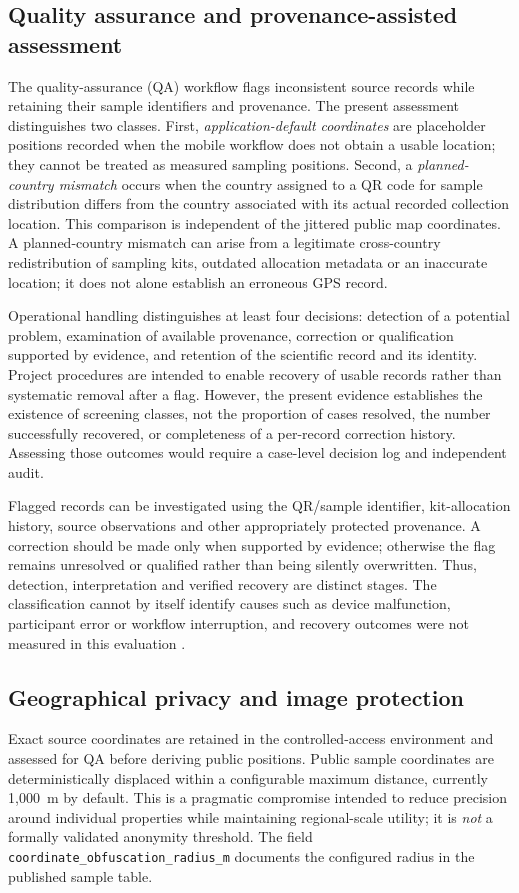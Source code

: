 \documentclass[11pt,a4paper]{article}
\newcommand{\code}[1]{\texttt{#1}}
\begin{document}
\subsection{Quality assurance and provenance-assisted assessment}
The quality-assurance (QA) workflow flags inconsistent source records while retaining their sample identifiers and provenance. The present assessment distinguishes two classes. First, \emph{application-default coordinates} are placeholder positions recorded when the mobile workflow does not obtain a usable location; they cannot be treated as measured sampling positions. Second, a \emph{planned-country mismatch} occurs when the country assigned to a QR code for sample distribution differs from the country associated with its actual recorded collection location. This comparison is independent of the jittered public map coordinates. A planned-country mismatch can arise from a legitimate cross-country redistribution of sampling kits, outdated allocation metadata or an inaccurate location; it does not alone establish an erroneous GPS record.

Operational handling distinguishes at least four decisions: detection of a potential problem, examination of available provenance, correction or qualification supported by evidence, and retention of the scientific record and its identity. Project procedures are intended to enable recovery of usable records rather than systematic removal after a flag. However, the present evidence establishes the existence of screening classes, not the proportion of cases resolved, the number successfully recovered, or completeness of a per-record correction history. Assessing those outcomes would require a case-level decision log and independent audit.

Flagged records can be investigated using the QR/sample identifier, kit-allocation history, source observations and other appropriately protected provenance. A correction should be made only when supported by evidence; otherwise the flag remains unresolved or qualified rather than being silently overwritten. Thus, detection, interpretation and verified recovery are distinct stages. The classification cannot by itself identify causes such as device malfunction, participant error or workflow interruption, and recovery outcomes were not measured in this evaluation \parencite{kosmala2016quality}.

\subsection{Geographical privacy and image protection}
Exact source coordinates are retained in the controlled-access environment and assessed for QA before deriving public positions. Public sample coordinates are deterministically displaced within a configurable maximum distance, currently 1,000~m by default. This is a pragmatic compromise intended to reduce precision around individual properties while maintaining regional-scale utility; it is \emph{not} a formally validated anonymity threshold. The field \code{coordinate\_obfuscation\_radius\_m} documents the configured radius in the published sample table.
\end{document}
